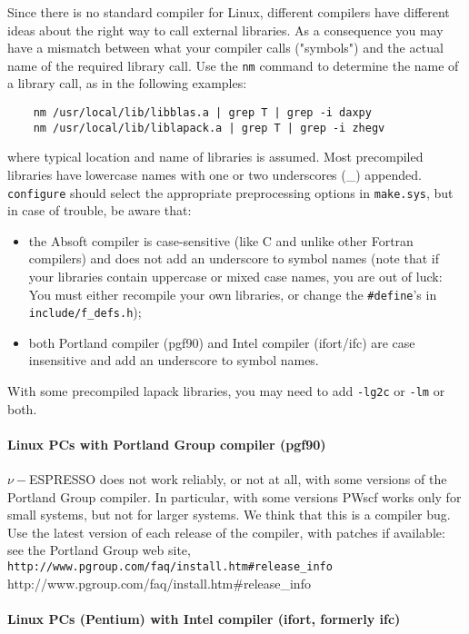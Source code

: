 \documentclass[12pt,a4paper]{article}
\begin{document}
Since there is no standard compiler for Linux, different compilers
have different ideas about the right way to call external libraries.
As a consequence you may have a mismatch between what your compiler
calls ("symbols") and the actual name of the required library call.
Use the \texttt{nm} command to determine the name of a library call,
as in the following examples:%
\begin{verbatim}
    nm /usr/local/lib/libblas.a | grep T | grep -i daxpy
    nm /usr/local/lib/liblapack.a | grep T | grep -i zhegv
\end{verbatim}
where typical location and name of libraries is assumed.
Most precompiled libraries have lowercase names with one or two
underscores (\_) appended. \texttt{configure} should select the 
appropriate preprocessing options in \texttt{make.sys}, but in
case of trouble, be aware that:
\begin{itemize}
  \item the Absoft compiler is case-sensitive (like C and unlike
        other Fortran compilers) and does not add an underscore
        to symbol names (note that if your libraries contain 
        uppercase or mixed case names, you are out of luck:
        You must either recompile your own libraries, or change 
        the \texttt{\#define}'s in \texttt{include/f\_defs.h});
  \item both Portland compiler (pgf90) and Intel compiler (ifort/ifc)
        are case insensitive and add an underscore to symbol names.
\end{itemize}

With some precompiled lapack libraries, you may need to add
\texttt{-lg2c} or \texttt{-lm} or both.

\paragraph{Linux PCs with Portland Group compiler (pgf90)}

$\nu-$ESPRESSO does not work reliably, or not at all, with some versions of
the Portland Group compiler.  In particular, with some versions PWscf
works only for small systems, but not for larger systems.  We think
that this is a compiler bug.  Use the latest version of each release
of the compiler, with patches if available: see the Portland Group web
site,\hfill\break
\htmladdnormallink%
{\texttt{http://www.pgroup.com/faq/install.htm\#release\_info}}%
{http://www.pgroup.com/faq/install.htm\#release\_info}

\paragraph{Linux PCs (Pentium) with Intel compiler (ifort, formerly
ifc)}
\end{document}
